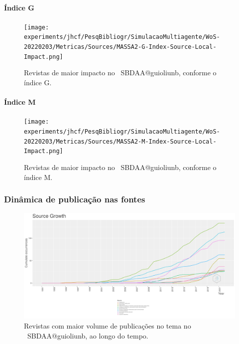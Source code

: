 \paragraph{Índice G}

\begin{figure}
    \centering
    \texttt{[image: experiments/jhcf/PesqBibliogr/SimulacaoMultiagente/WoS-20220203/Metricas/Sources/MASSA2-G-Index-Source-Local-Impact.png]}
    \caption{Revistas de maior impacto no  \dataset\ SBDAA@guioliunb,  conforme o índice G.}
    \label{fig:MASSA2-G-Index-Source-Local-Impact.png}
\end{figure}

\paragraph{Índice M}

\begin{figure}
    \centering
    \texttt{[image: experiments/jhcf/PesqBibliogr/SimulacaoMultiagente/WoS-20220203/Metricas/Sources/MASSA2-M-Index-Source-Local-Impact.png]}
    \caption{Revistas de maior impacto no  \dataset\ SBDAA@guioliunb,  conforme o índice M.}
    \label{fig:MASSA2-M-Index-Source-Local-Impact.png}
\end{figure}

\subsubsection{Dinâmica de publicação nas fontes}

\begin{figure}
    \centering
    \includegraphics[width=1\textwidth]{experiments/jhcf/PesqBibliogr/SimulacaoMultiagente/WoS-20220203/Metricas/Sources/MASSA2-Source-Dynamics.png}
    \caption{Revistas com maior volume de publicações no tema no  \dataset\ SBDAA@guioliunb, ao longo do tempo.}
    \label{fig:MASSA2-Source-Dynamics.png}
\end{figure}

